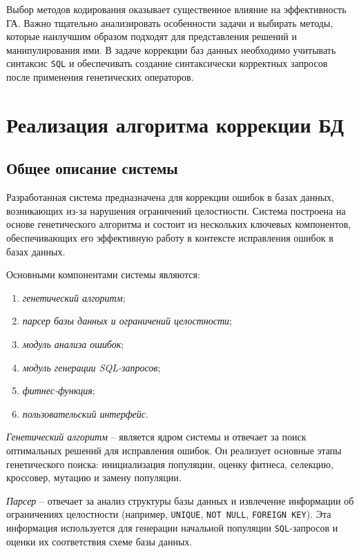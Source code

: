 \documentclass[master,paper]{pmk-graduate}
\begin{document}
Выбор методов кодирования оказывает существенное влияние на эффективность ГА. Важно тщательно анализировать особенности задачи и выбирать методы, которые наилучшим образом подходят для представления решений и манипулирования ими. В задаче коррекции баз данных необходимо учитывать синтаксис \texttt{SQL} и обеспечивать создание синтаксически корректных запросов после применения генетических операторов.


\chapter{Реализация алгоритма коррекции БД}
\label{chap2}
\section{Общее описание системы}
\label{sec21}

Разработанная система предназначена для коррекции ошибок в базах данных, возникающих из-за нарушения ограничений целостности. Система пост\-роена на основе генетического алгоритма и состоит из нескольких ключевых компонентов, обеспечивающих его эффективную работу в контексте исправления ошибок в базах данных. 

Основными компонентами системы являются:
\begin{enumerate}
	\item \textit{генетический алгоритм};
	\item \textit{парсер базы данных и ограничений целостности};
	\item \textit{модуль анализа ошибок};
	\item \textit{модуль генерации {SQL}-запросов};
	\item \textit{фитнес-функция};
	\item \textit{пользовательский интерфейс}.
\end{enumerate}

\textit{Генетический алгоритм} -- является ядром системы и отвечает за поиск оптимальных решений для исправления ошибок. Он реализует основные этапы генетического поиска: инициализация популяции, оценку фитнеса, селекцию, кроссовер, мутацию и замену популяции.

\textit{Парсер} -- отвечает за анализ структуры базы данных и извлечение информации об ограничениях целостности (например, \texttt{UNIQUE}, \texttt{NOT NULL}, \texttt{FOREIGN KEY}). Эта информация используется для генерации начальной популяции \texttt{SQL}-запросов и оценки их соответствия схеме базы данных.
\end{document}
